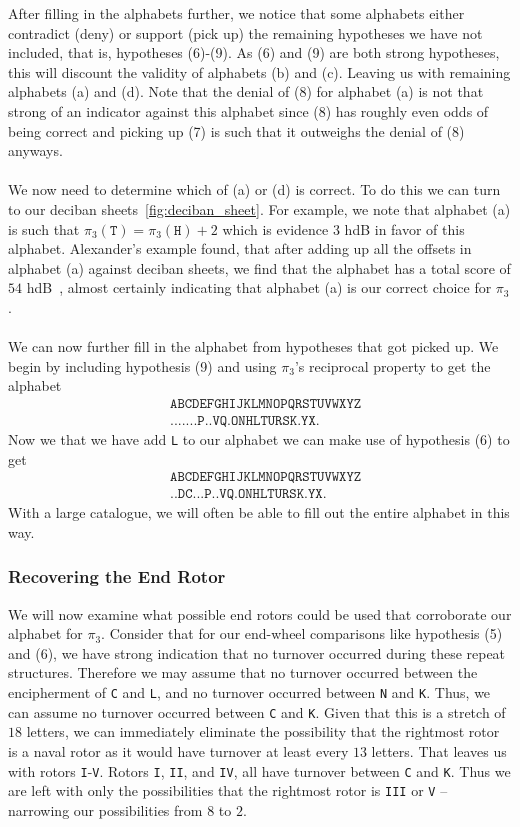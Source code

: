 \noindent  After filling in the alphabets further, we notice that
some alphabets either contradict (deny) or support (pick up) the
remaining hypotheses we have not included, that is, hypotheses
(6)-(9). As (6) and (9) are both strong hypotheses, this will
discount the validity of alphabets (b) and (c). Leaving us with
remaining alphabets (a) and (d). Note that the denial of (8) for
alphabet (a) is not that strong of an indicator against this
alphabet since (8) has roughly even odds of being correct and
picking up (7) is such that it outweighs the denial of (8) anyways.
\\\\We now need to determine which of (a) or (d) is correct. To do
this we can turn to our deciban sheets~\ref{fig:deciban_sheet}. For
example, we note that alphabet (a) is such that $\pi_3(\texttt{T}) =
\pi_3(\texttt{H}) + 2$ which is evidence $3$ hdB in favor of this
alphabet. Alexander's example found, that after adding up all the
offsets in alphabet (a) against deciban sheets, we find that the
alphabet has a total score of $54$ hdB~\cite[p.~101]{Alexander1945}, almost certainly indicating
that alphabet (a) is our correct choice for $\pi_3$.
\\\\We can now further fill in the alphabet from hypotheses that
got picked up. We begin by including hypothesis (9) and using
$\pi_3$'s reciprocal property to get the alphabet
\begin{align*}
  & \texttt{ABCDEFGHIJKLMNOPQRSTUVWXYZ} \\
  & \texttt{.......P..VQ.ONHLTURSK.YX.}
\end{align*}
Now we that we have add \texttt{L} to our alphabet we can make use
of hypothesis (6) to get
\begin{align*}
  & \texttt{ABCDEFGHIJKLMNOPQRSTUVWXYZ} \\
  & \texttt{..DC...P..VQ.ONHLTURSK.YX.}
\end{align*}
With a large catalogue, we will often be able to fill out the
entire alphabet in this way.

\subsubsection{Recovering the End Rotor}
We will now examine what possible end rotors could be used that
corroborate our alphabet for $\pi_3$. Consider that for our
end-wheel comparisons like hypothesis (5) and (6), we have strong
indication that no turnover occurred during these repeat
structures. Therefore we may assume that no turnover occurred
between the encipherment of \texttt{C} and \texttt{L}, and no
turnover occurred between \texttt{N} and \texttt{K}. Thus, we can
assume no turnover occurred between \texttt{C} and \texttt{K}.
Given that this is a stretch of $18$ letters, we can immediately
eliminate the possibility that the rightmost rotor is a naval rotor
as it would have turnover at least every $13$ letters. That leaves
us with rotors \texttt{I}-\texttt{V}. Rotors \texttt{I},
\texttt{II}, and \texttt{IV}, all have turnover between \texttt{C}
and \texttt{K}. Thus we are left with only the possibilities that
the rightmost rotor is \texttt{III} or \texttt{V} -- narrowing our
possibilities from $8$ to $2$.

